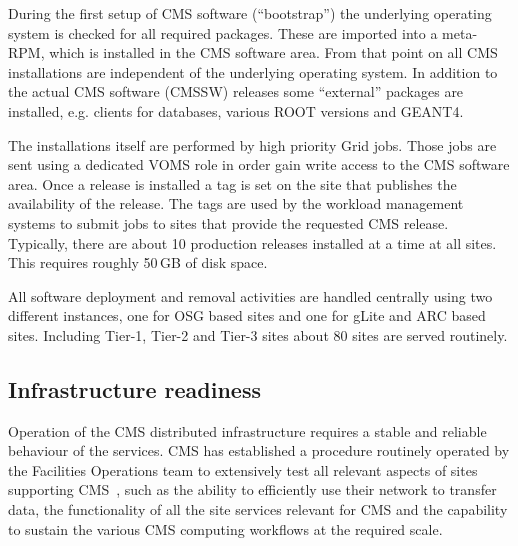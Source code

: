 During the
first setup of CMS software (``bootstrap'') the underlying operating system is
checked for all required packages. These are imported into a meta-RPM,
which is installed in the CMS software area. From that point on all
CMS installations are independent of the underlying operating
system. In addition to the actual CMS software (CMSSW) releases some ``external'' 
packages are installed, e.g. clients for databases, various ROOT
versions and GEANT4.

The installations itself are performed by high priority Grid
jobs. Those jobs are sent using a dedicated VOMS role %
in order gain write access to the CMS software area. Once a release is
installed a tag is set on the %
site that publishes the availability of
the release. The tags are used by the workload management systems to
submit jobs to sites that provide the requested CMS release.
Typically, there are about 10 production releases installed at a time at all
sites. This requires roughly 50\,GB of disk space.

All software deployment and  removal activities are handled centrally
using two different instances, one for OSG based sites and one for
gLite and ARC based sites. Including Tier-1, Tier-2 and Tier-3
sites about 80 sites are served routinely.

\subsection{Infrastructure readiness}
\label{sec:4_2}
Operation of the CMS distributed infrastructure requires a stable and 
reliable behaviour of the services.
CMS has established a procedure routinely operated by the Facilities 
Operations team to extensively test all relevant aspects of sites 
supporting CMS~\cite{RefSite}, such as the ability to efficiently use their 
network to transfer data, the functionality of all the site services relevant 
for CMS and the capability to sustain the various CMS computing workflows at 
the required scale.

